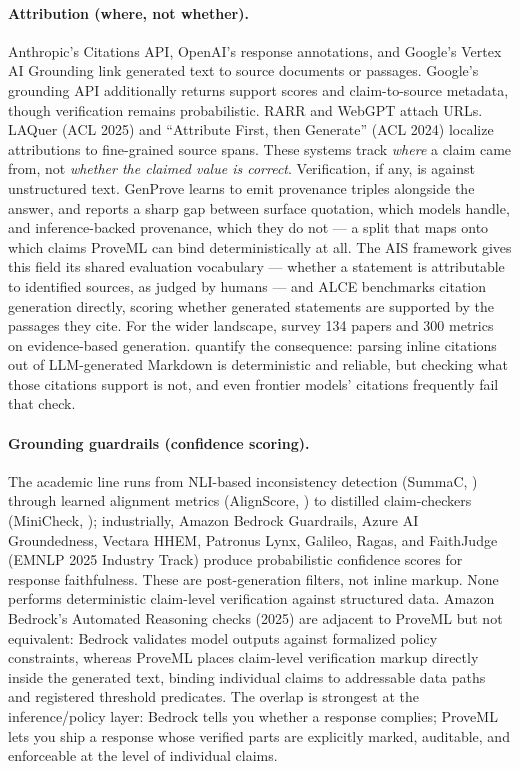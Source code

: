 \documentclass[11pt,a4paper]{article}
\begin{document}
\paragraph{Attribution (where, not whether).} Anthropic's Citations API, OpenAI's response annotations, and Google's Vertex AI Grounding \citep{googleground} link generated text to source documents or passages. Google's grounding API additionally returns support scores and claim-to-source metadata, though verification remains probabilistic. RARR \citep{rarr} and WebGPT \citep{webgpt} attach URLs. LAQuer (ACL 2025) and ``Attribute First, then Generate'' (ACL 2024) localize attributions to fine-grained source spans. These systems track \textit{where} a claim came from, not \textit{whether the claimed value is correct}. Verification, if any, is against unstructured text. GenProve \citep{genprove} learns to emit provenance triples alongside the answer, and reports a sharp gap between surface quotation, which models handle, and inference-backed provenance, which they do not --- a split that maps onto which claims ProveML can bind deterministically at all. The AIS framework \citep{ais} gives this field its shared evaluation vocabulary --- whether a statement is attributable to identified sources, as judged by humans --- and ALCE \citep{alce} benchmarks citation generation directly, scoring whether generated statements are supported by the passages they cite. For the wider landscape, \citet{evidencesurvey} survey 134 papers and 300 metrics on evidence-based generation. \citet{citednotverified} quantify the consequence: parsing inline citations out of LLM-generated Markdown is deterministic and reliable, but checking what those citations support is not, and even frontier models' citations frequently fail that check.

\paragraph{Grounding guardrails (confidence scoring).} The academic line runs from NLI-based inconsistency detection (SummaC, \citealp{summac}) through learned alignment metrics (AlignScore, \citealp{alignscore}) to distilled claim-checkers (MiniCheck, \citealp{minicheck}); industrially, Amazon Bedrock Guardrails, Azure AI Groundedness, Vectara HHEM, Patronus Lynx, Galileo, Ragas, and FaithJudge (EMNLP 2025 Industry Track) produce probabilistic confidence scores for response faithfulness. These are post-generation filters, not inline markup. None performs deterministic claim-level verification against structured data. Amazon Bedrock's Automated Reasoning checks (2025) are adjacent to ProveML but not equivalent: Bedrock validates model outputs against formalized policy constraints, whereas ProveML places claim-level verification markup directly inside the generated text, binding individual claims to addressable data paths and registered threshold predicates. The overlap is strongest at the inference/policy layer: Bedrock tells you whether a response complies; ProveML lets you ship a response whose verified parts are explicitly marked, auditable, and enforceable at the level of individual claims.
\end{document}
